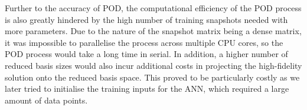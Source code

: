 Further to the accuracy of POD, the computational efficiency of the POD process is also greatly hindered by the high number of training snapshots needed with more parameters. Due to the nature of the snapshot matrix being a dense matrix, it was impossible to parallelise the process across multiple CPU cores, so the POD process would take a long time in serial. In addition, a higher number of reduced basis sizes would also incur additional costs in projecting the high-fidelity solution onto the reduced basis space. This proved to be particularly costly as we later tried to initialise the training inputs for the ANN, which required a large amount of data points.

\newpage